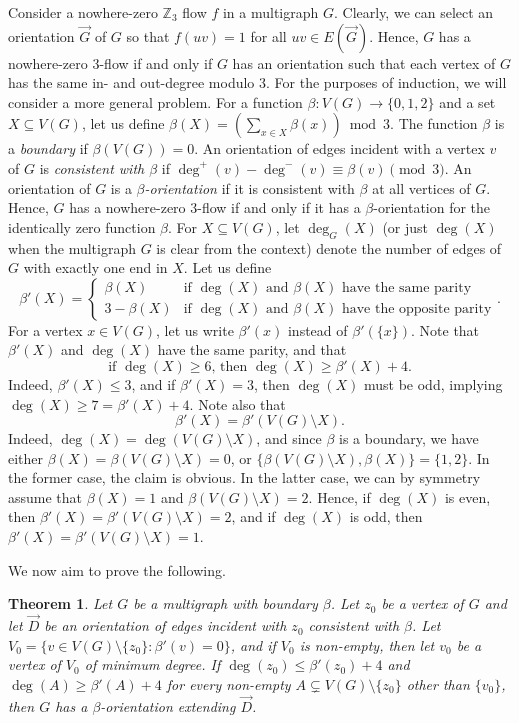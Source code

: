 \documentclass[12pt,twoside,openright,a4paper]{book}
\newtheorem{theorem}{Theorem}[chapter]
\begin{document}
Consider a nowhere-zero $\mathbb{Z}_3$ flow $f$ in a multigraph $G$. Clearly, we can select an orientation $\vec{G}$ of $G$
so that $f(uv)=1$ for all $uv\in E(\vec{G})$.  Hence, $G$ has a nowhere-zero $3$-flow if and only if $G$ has an orientation
such that each vertex of $G$ has the same in- and out-degree modulo $3$.  For the purposes of induction, we will consider
a more general problem.  For a function $\beta:V(G)\to \{0,1,2\}$ and a set $X\subseteq V(G)$, let us define $\beta(X)=(\sum_{x\in X} \beta(x))\bmod 3$.
The function $\beta$ is a \emph{boundary} if $\beta(V(G))=0$. An orientation of edges incident with a vertex $v$ of $G$ is \emph{consistent with $\beta$}
if $\deg^+(v)-\deg^-(v)\equiv \beta(v)\pmod 3$.
An orientation of $G$ is a \emph{$\beta$-orientation} if it is consistent with $\beta$ at all vertices of $G$.  Hence, $G$ has a nowhere-zero $3$-flow if and only if it has a $\beta$-orientation
for the identically zero function $\beta$.  For $X\subseteq V(G)$, let $\deg_G(X)$ (or just $\deg(X)$ when the multigraph $G$ is clear from the context)
denote the number of edges of $G$ with exactly one end in $X$.  Let us define
$$\beta'(X)=\begin{cases}
\beta(X)&\text{if $\deg(X)$ and $\beta(X)$ have the same parity}\\
3-\beta(X)&\text{if $\deg(X)$ and $\beta(X)$ have the opposite parity}
\end{cases}.$$
For a vertex $x\in V(G)$, let us write $\beta'(x)$ instead of $\beta'(\{x\})$.
Note that $\beta'(X)$ and $\deg(X)$ have the same parity, and that
\begin{equation}
\text{if $\deg(X)\ge 6$, then $\deg(X)\ge \beta'(X)+4$.}\label{eq:lbbeta}
\end{equation}
Indeed, $\beta'(X)\le 3$, and if $\beta'(X)=3$, then $\deg(X)$ must be odd, implying $\deg(X)\ge 7=\beta'(X)+4$.
Note also that
\begin{equation}
\beta'(X)=\beta'(V(G)\setminus X).\label{eq:compl}
\end{equation}
Indeed, $\deg(X)=\deg(V(G)\setminus X)$, and since $\beta$ is a boundary, we have either $\beta(X)=\beta(V(G)\setminus X)=0$,
or $\{\beta(V(G)\setminus X),\beta(X)\}=\{1,2\}$.  In the former case, the claim is obvious. In the latter case,
we can by symmetry assume that $\beta(X)=1$ and $\beta(V(G)\setminus X)=2$.  Hence, if $\deg(X)$ is even, then
$\beta'(X)=\beta'(V(G)\setminus X)=2$, and if $\deg(X)$ is odd, then $\beta'(X)=\beta'(V(G)\setminus X)=1$.

We now aim to prove the following.
\begin{theorem}\label{thm:6flowgen}
Let $G$ be a multigraph with boundary $\beta$. Let $z_0$ be a vertex of $G$
and let $\vec{D}$ be an orientation of edges incident with $z_0$ consistent with $\beta$.
Let $V_0=\{v\in V(G)\setminus \{z_0\}: \beta'(v)=0\}$, and if $V_0$ is non-empty, then
let $v_0$ be a vertex of $V_0$ of minimum degree.  If $\deg(z_0)\le \beta'(z_0)+4$ and $\deg(A)\ge \beta'(A)+4$ for every non-empty $A\subsetneq V(G)\setminus \{z_0\}$
other than $\{v_0\}$, then $G$ has a $\beta$-orientation extending $\vec{D}$.
\end{theorem}
\end{document}

